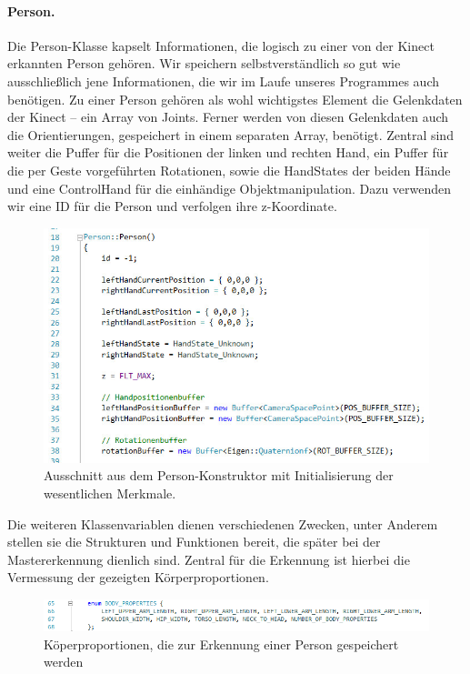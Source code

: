 	\paragraph{Person.} Die Person-Klasse kapselt Informationen, die logisch zu einer von der Kinect erkannten Person gehören. Wir speichern selbstverständlich so gut wie ausschließlich jene Informationen, die wir im Laufe unseres Programmes auch benötigen. Zu einer Person gehören als wohl wichtigstes Element die Gelenkdaten der Kinect -- ein Array von Joints. Ferner werden von diesen Gelenkdaten auch die Orientierungen, gespeichert in einem separaten Array, benötigt. Zentral sind weiter die Puffer für die Positionen der linken und rechten Hand, ein Puffer für die per Geste vorgeführten Rotationen, sowie die HandStates der beiden Hände und eine \glqq ControlHand\grqq{} für die einhändige Objektmanipulation. Dazu verwenden wir eine ID für die Person und verfolgen ihre z-Koordinate. 
	\begin{figure}[h]
	\centering
	\includegraphics[scale=.5]{pictures/person.jpg}
	\caption{Ausschnitt aus dem Person-Konstruktor mit Initialisierung der wesentlichen Merkmale.}
	\end{figure}\par\medskip
	
	Die weiteren Klassenvariablen dienen verschiedenen Zwecken, unter Anderem stellen sie die Strukturen und Funktionen bereit, die später bei der Mastererkennung dienlich sind. Zentral für die Erkennung ist hierbei die Vermessung der gezeigten Körperproportionen.
	\begin{figure}[h]
	\centering
	\includegraphics[scale=.7]{pictures/bodyproperties.png}
	\caption{Köperproportionen, die zur Erkennung einer Person gespeichert werden}
	\end{figure}\par\medskip
	
